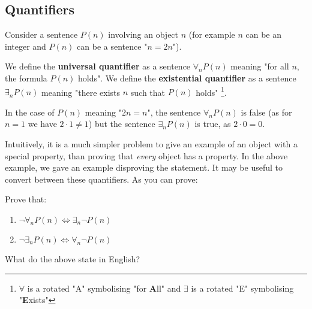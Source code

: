 \subsection{Quantifiers}
Consider a sentence $P(n)$ involving an object $n$ (for example $n$ can be an integer and $P(n)$ can be a sentence "$n=2n$").
\begin{definition}
  We define the \textbf{universal quantifier}
  as a sentence $\forall_n P(n)$ meaning "for all $n$, the formula $P(n)$ holds".
  We define the \textbf{existential quantifier} as a sentence $\exists_n P(n)$ meaning "there exists $n$ such that $P(n)$ holds"
  \footnote{$\forall$ is a rotated "A" symbolising "for \textbf{A}ll" and $\exists$ is a rotated "E" symbolising "\textbf{E}xists"}.
\end{definition}

\begin{example}
  In the case of $P(n)$ meaning "$2n=n$", the sentence $\forall_n P(n)$ is false (as for $n=1$ we have $2\cdot 1\neq 1$) but the sentence $\exists_n P(n)$ is true,
  as $2\cdot 0=0$.
\end{example}

Intuitively, it is a much simpler problem to give an example of an object with a special property, than proving that \emph{every} object has a property.
In the above example, we gave an example disproving the statement. It may be useful to convert between these quantifiers. As you can prove:

\begin{exercise}
  Prove that:
  \begin{enumerate}
    \item $\neg \forall_n P(n) \Leftrightarrow \exists_n \neg P(n)$
    \item $\neg \exists_n P(n) \Leftrightarrow \forall_n \neg P(n)$
  \end{enumerate}
  What do the above state in English?
\end{exercise}
